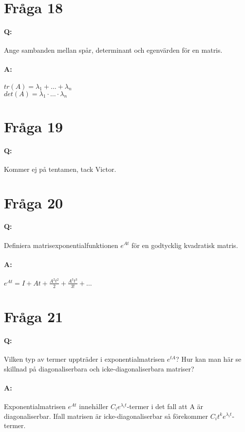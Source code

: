 \documentclass[a4paper]{article}
\begin{document}
\section{Fråga 18}
\paragraph{Q:} Ange sambanden mellan spår, determinant och egenvärden för en matris.
\paragraph{A:} $tr(A)=\lambda_1 + \ldots + \lambda_n$ \\ $det(A)=\lambda_1 \cdot \ldots \cdot \lambda_n$

\section{Fråga 19}
\paragraph{Q:} Kommer ej på tentamen, tack Victor.

\section{Fråga 20}
\paragraph{Q:} Definiera matrisexponentialfunktionen $e^{At}$ för en godtycklig kvadratisk matris. 
\paragraph{A:} $e^{At} = I + At + \frac{A^2t^2}{2} +  \frac{A^3t^3}{3!} + \ldots$

\section{Fråga 21}
\paragraph{Q:} Vilken typ av termer uppträder i exponentialmatrisen $e^{tA}$? Hur kan man här se skillnad på diagonaliserbara och icke-diagonaliserbara matriser?
\paragraph{A:} Exponentialmatrisen $e^{At}$ innehåller $C_ie^{\lambda_it}$-termer i det fall att A är diagonaliserbar. Ifall matrisen är icke-diagonaliserbar så förekommer $C_it^ke^{\lambda_it}$-termer.
\end{document}
